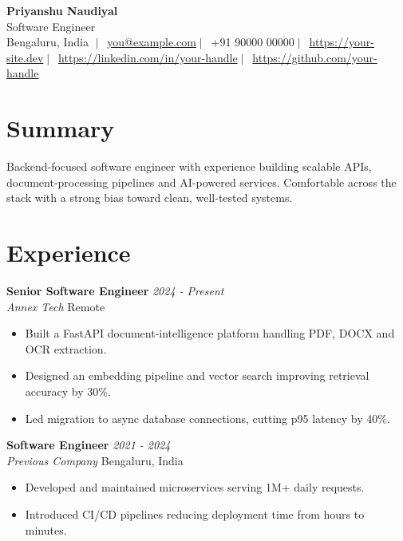 \documentclass[11pt,a4paper]{article}
\newcommand{\entry}[4]{%
  \noindent\textbf{#1} \hfill \textit{#2}\\[1pt]
  \textit{#3} \hfill #4\\[2pt]
}
\begin{document}
\begin{center}
  {\Huge\bfseries Priyanshu Naudiyal}\\[4pt]
  Software Engineer\\[6pt]
  \small
  Bengaluru, India
$\;|\;$\faEnvelope\ \href{mailto:you@example.com}{you@example.com}$\;|\;$\faPhone\ +91 90000 00000$\;|\;$\faGlobe\ \href{https://your-site.dev}{https://your-site.dev}$\;|\;$\faLinkedin\ \href{https://linkedin.com/in/your-handle}{https://linkedin.com/in/your-handle}$\;|\;$\faGithub\ \href{https://github.com/your-handle}{https://github.com/your-handle}\end{center}

\section{Summary}
Backend-focused software engineer with experience building scalable APIs, document-processing pipelines and AI-powered services. Comfortable across the stack with a strong bias toward clean, well-tested systems.


\section{Experience}
\entry{Senior Software Engineer}{2024 - Present}{Annex Tech}{Remote}
\begin{itemize}
  \item Built a FastAPI document-intelligence platform handling PDF, DOCX and OCR extraction.
  \item Designed an embedding pipeline and vector search improving retrieval accuracy by 30\%.
  \item Led migration to async database connections, cutting p95 latency by 40\%.
\end{itemize}
\vspace{4pt}
\entry{Software Engineer}{2021 - 2024}{Previous Company}{Bengaluru, India}
\begin{itemize}
  \item Developed and maintained microservices serving 1M+ daily requests.
  \item Introduced CI/CD pipelines reducing deployment time from hours to minutes.
\end{itemize}
\vspace{4pt}
\end{document}
